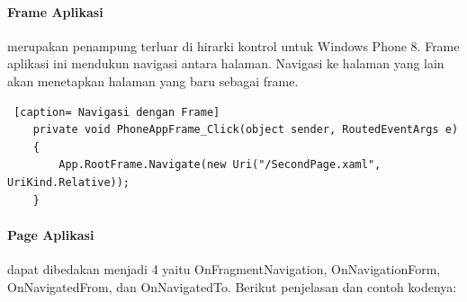 \paragraph{Frame Aplikasi}
\label{subsubsec:Frame Aplikasi}
merupakan penampung terluar di hirarki kontrol untuk Windows Phone 8. Frame aplikasi ini mendukun navigasi antara halaman. Navigasi ke halaman yang lain akan menetapkan halaman yang baru sebagai frame.

\begin{lstlisting} [caption= Navigasi dengan Frame]
	private void PhoneAppFrame_Click(object sender, RoutedEventArgs e)
	{
		App.RootFrame.Navigate(new Uri("/SecondPage.xaml", UriKind.Relative));
	}
\end{lstlisting}

\paragraph{Page Aplikasi}
\label{subsubsec:Page Aplikasi}
dapat dibedakan menjadi 4 yaitu OnFragmentNavigation, OnNavigationForm, OnNavigatedFrom, dan OnNavigatedTo. Berikut penjelasan dan contoh kodenya:

